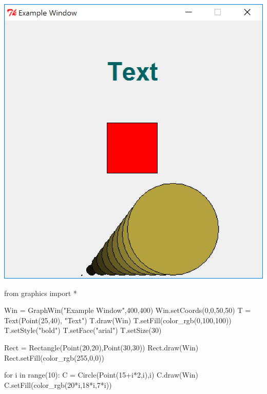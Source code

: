\begin{marginfigure}[170pt]
  \includegraphics[width=\linewidth]{GraphicsExample1.jpg}
\end{marginfigure}
\begin{python}
from graphics import *

Win = GraphWin("Example Window",400,400)
Win.setCoords(0,0,50,50)
T = Text(Point(25,40), "Text")
T.draw(Win)
T.setFill(color_rgb(0,100,100))
T.setStyle("bold")
T.setFace("arial")
T.setSize(30)

Rect = Rectangle(Point(20,20),Point(30,30))
Rect.draw(Win)
Rect.setFill(color_rgb(255,0,0))

for i in range(10):
    C = Circle(Point(15+i*2,i),i)
    C.draw(Win)
    C.setFill(color_rgb(20*i,18*i,7*i))
\end{python}


















